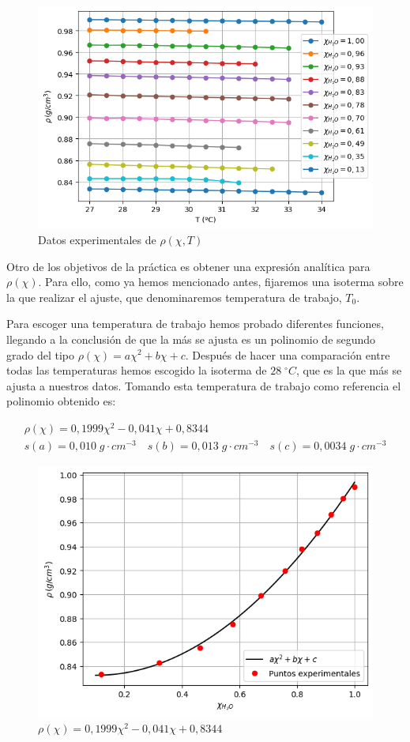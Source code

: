 \documentclass[a4paper,12pt,titlepage]{article}
\begin{document}
\begin{figure}[h!]
    \centering
    \includegraphics[width=0.75\linewidth]{Densidad/rho-T.png}
    \caption{Datos experimentales de $\rho(\chi,T)$}
    \label{fig:enter-label}
\end{figure}

Otro de los objetivos de la práctica es obtener una expresión analítica para $\rho(\chi)$. Para ello, como ya hemos mencionado antes, fijaremos una isoterma sobre la que realizar el ajuste, que denominaremos temperatura de trabajo, $T_0$.

Para escoger una temperatura de trabajo hemos probado diferentes funciones, llegando a la conclusión de que la más se ajusta es un polinomio de segundo grado del tipo $\rho(\chi) = a\chi^2 + b\chi + c$. Después de hacer una comparación entre todas las temperaturas hemos escogido la isoterma de $28 \;^{\circ}C$, que es la que más se ajusta a nuestros datos. Tomando esta temperatura de trabajo como referencia el polinomio obtenido es:

\begin{equation}
    \begin{gathered}
        \rho(\chi) = 0,1999\chi^2 - 0,041\chi + 0,8344\\
        s(a) = 0,010 \; g\cdot cm^{-3} \quad s(b) = 0,013 \; g\cdot cm^{-3} \quad s(c)= 0,0034 \; g\cdot cm^{-3}
    \end{gathered}
\end{equation}

\begin{figure}[h!]
    \centering
    \includegraphics[width=0.65\linewidth]{Densidad/rho-x.png}
    \caption{$\rho(\chi) = 0,1999\chi^2 - 0,041\chi + 0,8344$}
    \label{fig:enter-label}
\end{figure}
\end{document}
